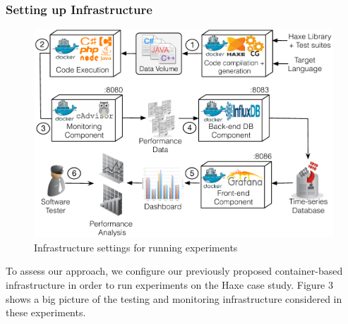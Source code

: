 \subsubsection{Setting up Infrastructure}
\begin{figure}[h]
	\centering
	\includegraphics[width=1\linewidth]{Ressources/settingup.pdf}
	\caption{Infrastructure settings for running experiments}
\end{figure}
To assess our approach, we configure our previously proposed container-based infrastructure in order to run experiments on the Haxe case study.
Figure 3 shows a big picture of the testing and monitoring infrastructure considered in these experiments.


